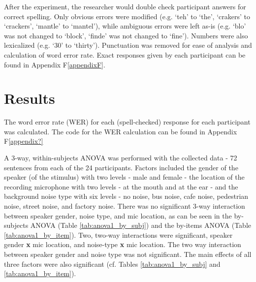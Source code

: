 \documentclass[dissertation,copyright]{uathesis}
\begin{document}
After the experiment, the researcher would double check participant answers for correct spelling.  Only obvious errors were modified (e.g. `teh' to `the', `crakers' to `crackers', `mantle' to `mantel'), while ambiguous errors were left as-is (e.g. `blo' was not changed to `block', `finde' was not changed to `fine').  Numbers were also lexicalized (e.g. `30' to `thirty').  Punctuation was removed for ease of analysis and calculation of word error rate.  Exact responses given by each participant can be found in Appendix F\ref{appendixF}.


\section{Results}
\label{ch4:results}



The word error rate (WER) for each (spell-checked) response for each participant was calculated. The code for the WER calculation can be found in Appendix F\ref{appendix?}

A 3-way, within-subjects ANOVA was performed with the collected data - 72 sentences from each of the 24 participants. Factors included the gender of the speaker (of the stimulus) with two levels - male and female - the location of the recording microphone with two levels - at the mouth and at the ear - and the background noise type with six levels - no noise, bus noise, cafe noise, pedestrian noise, street noise, and factory noise.  There was no significant 3-way interaction between speaker gender, noise type, and mic location, as can be seen in the by-subjects ANOVA (Table \ref{tab:anova1_by_subj}) and the by-items ANOVA (Table \ref{tab:anova1_by_item}). Two, two-way interactions were significant, speaker gender \textbf{x} mic location, and noise-type \textbf{x} mic location. The two way interaction between speaker gender and noise type was not significant.  The main effects of all three factors were also significant (cf. Tables \ref{tab:anova1_by_subj} and \ref{tab:anova1_by_item}).
\end{document}
